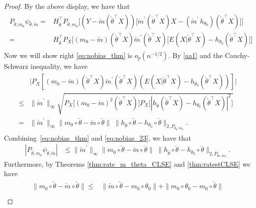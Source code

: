 {\begin{proof}
By the above display, we have that
\begin{align}
\begin{split} \label{eq:nobias_thm}
P_{\check{\theta}, m_0} \psi_{\check{\theta},\check{m}}={}& H_{\check\theta}^\top P_{\check{\theta},m_0}\bigg[(Y-\check{m}(\check{\theta}^\top X)) \big[\check{m}^\prime(\check{\theta}^\top X) X- (\check{m}^\prime \, h_{\theta_0})(\check{\theta} ^\top X)\big] \bigg]\\
={}&H_{\check\theta}^\top P_X\bigg[(m_0-\check{m})(\check{\theta}^\top X)\check{m}^\prime(\check{\theta}^\top X) \big[ E(X|\check{\theta}^\top X)- h_{\theta_0}(\check{\theta}^\top X)\big] \bigg]
\end{split}
\end{align}
Now we will show right \eqref{eq:nobias_thm} is $o_p(n^{-1/2}).$ By \ref{aa1} and the Cauchy-Schwarz inequality, we have
\begin{align}\label{eq:nobias_23}
\begin{split}
&\big|P_X[(m_0-\check{m})(\check{\theta}^\top X) \check{m}^\prime(\check{\theta}^\top X) (E(X|\check{\theta}^\top X)-h_{\theta_0}(\check{\theta}^\top X)) ]\big|\\
\le{}& \|\check{m}^\prime\|_\infty \sqrt{P_X\big[(m_0-\check{m})^2(\check{\theta}^\top X)\big] P_X\big[ |h_{\check{\theta}}(\check{\theta}^\top X)-h_{\theta_0}(\check{\theta}^\top X)|^2\big] }\\
={}& \|\check{m}^\prime\|_\infty \|m_0\circ\check{\theta}-\check{m}\circ\check{\theta}\| \; \| h_{\check{\theta}}\circ\check{\theta}-h_{\theta_0}\circ\check{\theta}\|_{2,P_{\theta_0,m_0}}.
\end{split}
\end{align}
Combining~\eqref{eq:nobias_thm} and \eqref{eq:nobias_23},  we have that
\begin{align}\label{eq:Lip:nobias_1}
|P_{\check{\theta}, m_0} \psi_{\check{\theta},\check{m}}|&\le \|\check{m}^\prime\|_\infty \|m_0\circ\check{\theta}-\check{m}\circ\check{\theta}\| \; \| h_{\check{\theta}}\circ\check{\theta}-h_{\theta_0}\circ\check{\theta}\|_{2,P_{\theta_0, m_0}}.
\end{align}
  Furthermore, by Theorems \ref{thm:rate_m_theta_CLSE} and  \ref{thm:ratestCLSE}  we have
 \begin{align}
\begin{split}
\|m_0\circ\check{\theta}-\check{m}\circ\check{\theta}\| \le{}&\|\check{m}\circ\check{\theta} - m_0 \circ\theta_0 \| + \|m_0 \circ\theta_0 -m_0\circ\check{\theta} \| \\

\end{split}
\end{align}
\end{proof}}
